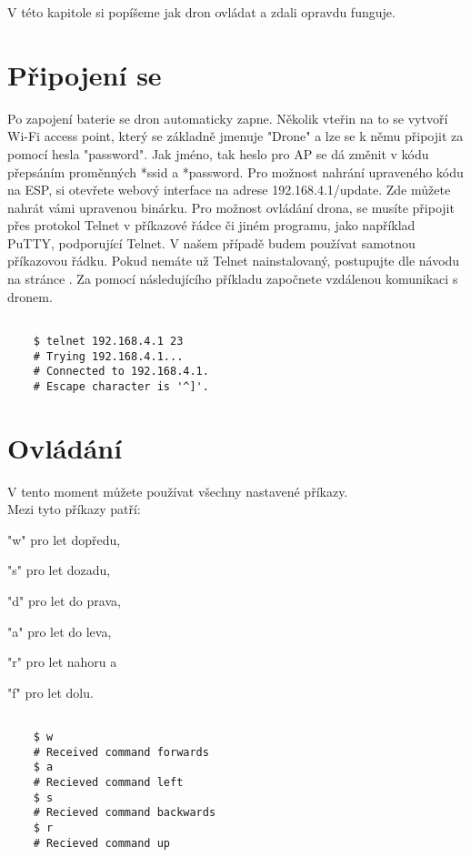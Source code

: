 V této kapitole si popíšeme jak dron ovládat a zdali opravdu funguje.

\section{Připojení se}
    Po zapojení baterie se dron automaticky zapne. Několik vteřin na to se vytvoří Wi-Fi access point, který se základně jmenuje "Drone" a lze se k němu připojit za pomocí hesla "password". Jak jméno, tak heslo pro AP se dá změnit v kódu přepsáním proměnných *ssid a *password. Pro možnost nahrání upraveného kódu na ESP, si otevřete webový interface na adrese 192.168.4.1/update. Zde můžete nahrát vámi upravenou binárku. Pro možnost ovládání drona, se musíte připojit přes protokol Telnet v příkazové řádce či jiném programu, jako například PuTTY, podporující Telnet. V našem případě budem používat samotnou příkazovou řádku. Pokud nemáte už Telnet nainstalovaný, postupujte dle návodu na stránce \parencite[Telnet download tutorial]{telnet}. Za pomocí následujícího příkladu započnete vzdálenou komunikaci s dronem.
    
    \begin{lstlisting}

    $ telnet 192.168.4.1 23
    # Trying 192.168.4.1...
    # Connected to 192.168.4.1.
    # Escape character is '^]'.

    \end{lstlisting}

\newpage

\section{Ovládání}
    V tento moment můžete používat všechny nastavené příkazy.\\ Mezi tyto příkazy patří:\par "w" pro let dopředu,\par "s" pro let dozadu,\par "d" pro let do prava,\par "a" pro let do leva,\par "r" pro let nahoru a\par "f" pro let dolu.

    \begin{lstlisting}

    $ w
    # Received command forwards
    $ a
    # Recieved command left
    $ s
    # Recieved command backwards
    $ r
    # Recieved command up
       
    \end{lstlisting}

